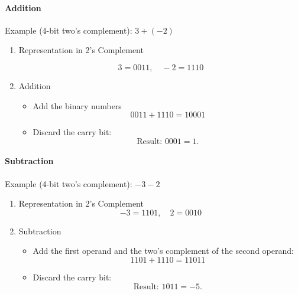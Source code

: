 \paragraph{Addition} Example (4-bit two's complement):
\(
3 + (-2)
\)
\begin{enumerate}
    \item Representation in 2's Complement

\[
3 = 0011, \quad -2 = 1110
\]

    \item Addition
\begin{itemize}
    \item Add the binary numbers
   \[
   0011 + 1110 = 1 0001
   \]
    \item Discard the carry bit:
   \[
   \text{Result: } 0001 = 1.
   \]
\end{itemize}
\end{enumerate}

\paragraph{Subtraction} Example (4-bit two's complement):
\(
-3 - 2
\)
\begin{enumerate}
    \item Representation in 2's Complement
\[
-3 = 1101, \quad 2 = 0010
\]

    \item Subtraction
\begin{itemize}
    \item Add the first operand and the two's complement of the second operand:
   \[
   1101 + 1110 = 1 1011
   \]
    \item Discard the carry bit:
   \[
   \text{Result: } 1011 = -5.
   \]
\end{itemize}
\end{enumerate}


